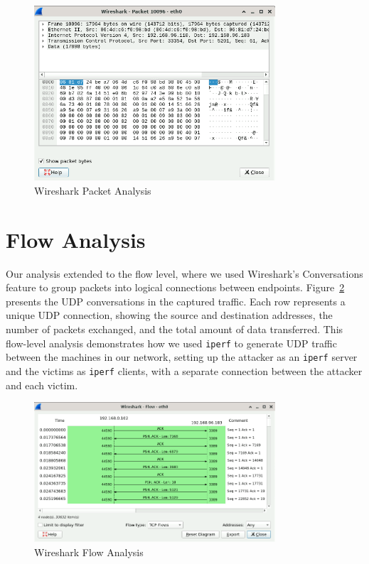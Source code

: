 \begin{figure}[H]
\centering
\includegraphics[width=0.8\textwidth]{img/level2/level2-server-packet-analysis.png}
\caption{Wireshark Packet Analysis}\label{fig:WiresharkPacketAnalysis}
\end{figure}

\section{Flow Analysis}

Our analysis extended to the flow level, where we used Wireshark's Conversations feature to group packets into logical connections between endpoints. Figure~\ref{fig:WiresharkFlowAnalysis} presents the UDP conversations in the captured traffic. Each row represents a unique UDP connection, showing the source and destination addresses, the number of packets exchanged, and the total amount of data transferred. This flow-level analysis demonstrates how we used \texttt{iperf} to generate UDP traffic between the machines in our network, setting up the attacker as an \texttt{iperf} server and the victims as \texttt{iperf} clients, with a separate connection between the attacker and each victim.

\begin{figure}[H]
\centering
\includegraphics[width=0.8\textwidth]{img/level2/level2-server-flow-analysis.png}
\caption{Wireshark Flow Analysis}\label{fig:WiresharkFlowAnalysis}
\end{figure}

